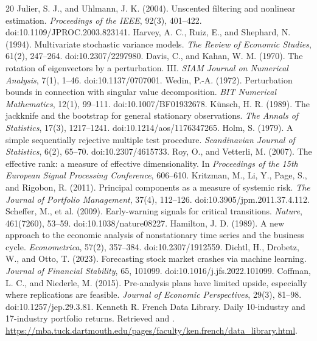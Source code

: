 \documentclass[11pt]{article}
\begin{document}
\FloatBarrier
\begin{thebibliography}{20}
 Julier, S. J., and Uhlmann, J. K. (2004). Unscented filtering and nonlinear estimation. \emph{Proceedings of the IEEE}, 92(3), 401--422. doi:10.1109/JPROC.2003.823141.
 Harvey, A. C., Ruiz, E., and Shephard, N. (1994). Multivariate stochastic variance models. \emph{The Review of Economic Studies}, 61(2), 247--264. doi:10.2307/2297980.
 Davis, C., and Kahan, W. M. (1970). The rotation of eigenvectors by a perturbation. III. \emph{SIAM Journal on Numerical Analysis}, 7(1), 1--46. doi:10.1137/0707001.
 Wedin, P.-A. (1972). Perturbation bounds in connection with singular value decomposition. \emph{BIT Numerical Mathematics}, 12(1), 99--111. doi:10.1007/BF01932678.
 K\"unsch, H. R. (1989). The jackknife and the bootstrap for general stationary observations. \emph{The Annals of Statistics}, 17(3), 1217--1241. doi:10.1214/aos/1176347265.
 Holm, S. (1979). A simple sequentially rejective multiple test procedure. \emph{Scandinavian Journal of Statistics}, 6(2), 65--70. doi:10.2307/4615733.
 Roy, O., and Vetterli, M. (2007). The effective rank: a measure of effective dimensionality. In \emph{Proceedings of the 15th European Signal Processing Conference}, 606--610.
 Kritzman, M., Li, Y., Page, S., and Rigobon, R. (2011). Principal components as a measure of systemic risk. \emph{The Journal of Portfolio Management}, 37(4), 112--126. doi:10.3905/jpm.2011.37.4.112.
 Scheffer, M., et al. (2009). Early-warning signals for critical transitions. \emph{Nature}, 461(7260), 53--59. doi:10.1038/nature08227.
 Hamilton, J. D. (1989). A new approach to the economic analysis of nonstationary time series and the business cycle. \emph{Econometrica}, 57(2), 357--384. doi:10.2307/1912559.
 Dichtl, H., Drobetz, W., and Otto, T. (2023). Forecasting stock market crashes via machine learning. \emph{Journal of Financial Stability}, 65, 101099. doi:10.1016/j.jfs.2022.101099.
 Coffman, L. C., and Niederle, M. (2015). Pre-analysis plans have limited upside, especially where replications are feasible. \emph{Journal of Economic Perspectives}, 29(3), 81--98. doi:10.1257/jep.29.3.81.
 Kenneth R. French Data Library. Daily 10-industry and 17-industry portfolio returns. Retrieved \RetrievalDate{} and \SecondaryRetrievalDate. \url{https://mba.tuck.dartmouth.edu/pages/faculty/ken.french/data_library.html}.
\end{thebibliography}
\end{document}

